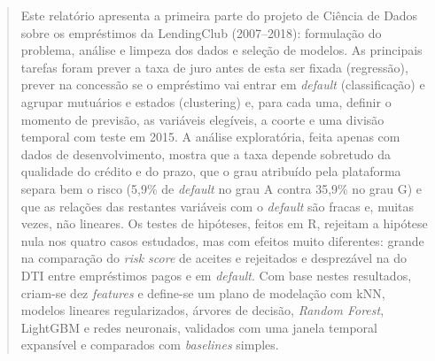 \renewcommand{\IEEEkeywordsname}{Palavras-chave}

\begin{abstract}
Este relatório apresenta a primeira parte do projeto de Ciência de Dados sobre os empréstimos da LendingClub (2007--2018): formulação do problema, análise e limpeza dos dados e seleção de modelos. As principais tarefas foram prever a taxa de juro antes de esta ser fixada (regressão), prever na concessão se o empréstimo vai entrar em \textit{default} (classificação) e agrupar mutuários e estados (clustering) e, para cada uma, definir o momento de previsão, as variáveis elegíveis, a coorte e uma divisão temporal com teste em 2015. A análise exploratória, feita apenas com dados de desenvolvimento, mostra que a taxa depende sobretudo da qualidade do crédito e do prazo, que o grau atribuído pela plataforma separa bem o risco (5,9\% de \textit{default} no grau A contra 35,9\% no grau G) e que as relações das restantes variáveis com o \textit{default} são fracas e, muitas vezes, não lineares. Os testes de hipóteses, feitos em R, rejeitam a hipótese nula nos quatro casos estudados, mas com efeitos muito diferentes: grande na comparação do \textit{risk score} de aceites e rejeitados e desprezável na do DTI entre empréstimos pagos e em \textit{default}. Com base nestes resultados, criam-se dez \textit{features} e define-se um plano de modelação com kNN, modelos lineares regularizados, árvores de decisão, \textit{Random Forest}, LightGBM e redes neuronais, validados com uma janela temporal expansível e comparados com \textit{baselines} simples.
\end{abstract}
